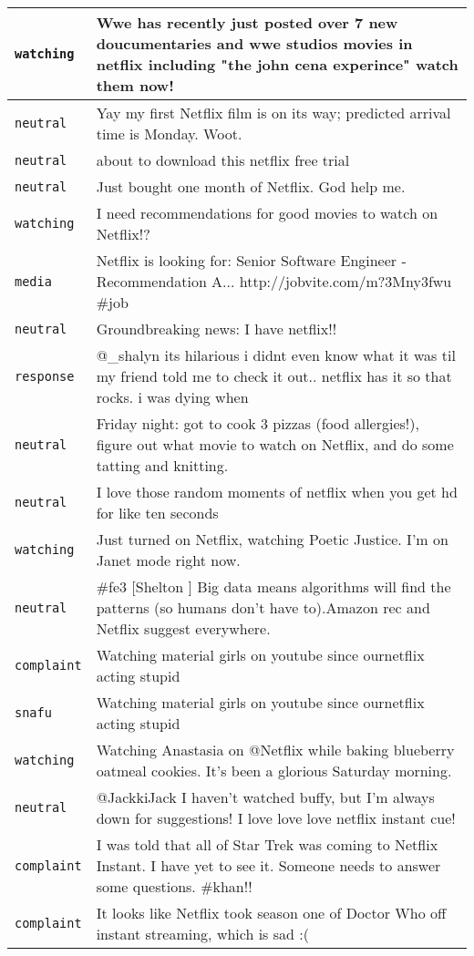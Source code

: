 \begin{center}
\begin{longtable}{|l|p{120mm}|}
      \tabularnewline\hline
         \texttt{watching} & Wwe has recently just posted over 7 new doucumentaries and wwe studios movies in netflix including "the john cena experince" watch them now!
      \tabularnewline\hline
         \texttt{neutral} & Yay my first Netflix film is on its way; predicted arrival time is Monday. Woot.
      \tabularnewline\hline
         \texttt{neutral} & about to download this netflix free trial
      \tabularnewline\hline
         \texttt{neutral} & Just bought one month of Netflix. God help me.
      \tabularnewline\hline
         \texttt{watching} & I need recommendations for good movies to watch on Netflix!?
      \tabularnewline\hline
         \texttt{media} & Netflix is looking for: Senior Software Engineer - Recommendation A... http://jobvite.com/m?3Mny3fwu \#job
      \tabularnewline\hline
         \texttt{neutral} & Groundbreaking news: I have netflix!!
      \tabularnewline\hline
         \texttt{response} & @\_shalyn its hilarious i didnt even know what it was til my friend told me to check it out.. netflix has it so that rocks. i was dying when
      \tabularnewline\hline
         \texttt{neutral} & Friday night: got to cook 3 pizzas (food allergies!), figure out what movie to watch on Netflix, and do some tatting and knitting.
      \tabularnewline\hline
         \texttt{neutral} & I love those random moments of netflix when you get hd for like ten seconds
      \tabularnewline\hline
         \texttt{watching} & Just turned on Netflix, watching Poetic Justice. I'm on Janet mode right now.
      \tabularnewline\hline
         \texttt{neutral} & \#fe3 [Shelton ] Big data means algorithms will find the patterns (so humans don't have to).Amazon rec and Netflix suggest everywhere.
      \tabularnewline\hline
         \texttt{complaint} & Watching material girls on youtube since ournetflix acting stupid
      \tabularnewline\hline
         \texttt{snafu} & Watching material girls on youtube since ournetflix acting stupid
      \tabularnewline\hline
         \texttt{watching} & Watching Anastasia on @Netflix while baking blueberry oatmeal cookies. It's been a glorious Saturday morning.
      \tabularnewline\hline
         \texttt{neutral} & @JackkiJack I haven't watched buffy, but I'm always down for suggestions! I love love love netflix instant cue!
      \tabularnewline\hline
         \texttt{complaint} & I was told that all of Star Trek was coming to Netflix Instant. I have yet to see it. Someone needs to answer some questions. \#khan!!
      \tabularnewline\hline
         \texttt{complaint} & It looks like Netflix took season one of Doctor Who off instant streaming, which is sad :(

\end{longtable}
\end{center}
